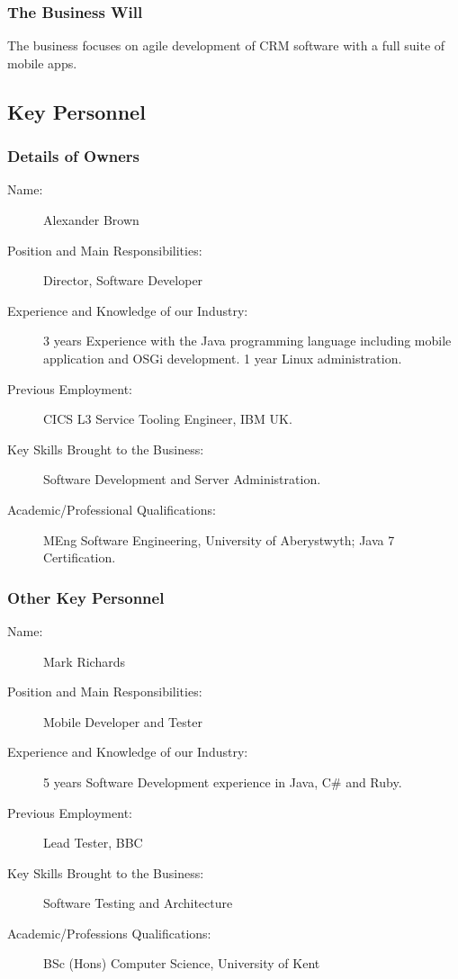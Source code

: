 \documentclass[DIV=calc, paper=a4, fontsize=11pt]{scrartcl}	 %
\begin{document}
\subsubsection*{The Business Will}
The business focuses on agile development of CRM software with a full suite of mobile apps.


\subsection{Key Personnel}
\subsubsection*{Details of Owners}
\begin{description}
\item[Name:] Alexander Brown
\item[Position and Main Responsibilities:] Director, Software Developer
\item[Experience and Knowledge of our Industry:] 3 years Experience with the Java programming 
language including mobile application and OSGi development. 1 year Linux administration. %
\item[Previous Employment:] CICS L3 Service Tooling Engineer, IBM UK.
\item[Key Skills Brought to the Business:] Software Development and Server Administration.
\item[Academic/Professional Qualifications:] MEng Software Engineering, University of Aberystwyth; 
Java 7 Certification.
\end{description}

\subsubsection*{Other Key Personnel}
\begin{description}
\item[Name:] Mark Richards
\item[Position and Main Responsibilities:] Mobile Developer and Tester
\item[Experience and Knowledge of our Industry:] 5 years Software Development experience in Java, 
C\# and Ruby.
\item[Previous Employment:] Lead Tester, BBC
\item[Key Skills Brought to the Business:] Software Testing and Architecture
\item[Academic/Professions Qualifications:] BSc (Hons) Computer Science, University of Kent
\end{description}
\end{document}
